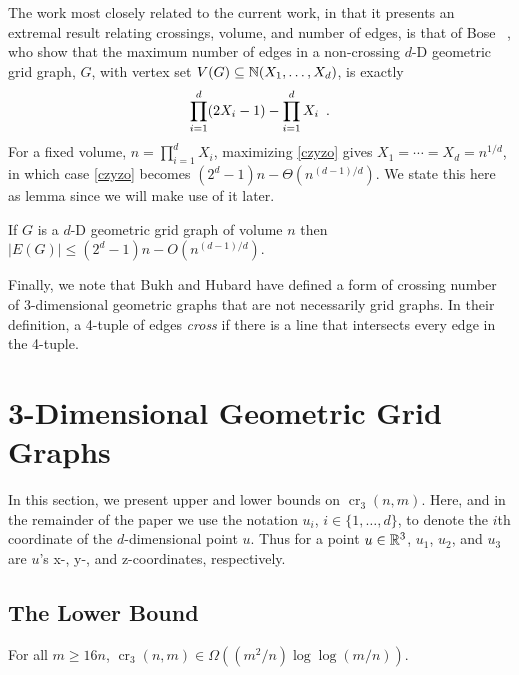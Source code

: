\documentclass{patmorin}
\DeclareMathOperator{\crs}{cr}
\begin{document}
The work most closely related to the current work, in that it presents
an extremal result relating crossings, volume, and number of edges, is
that of Bose \etal~\cite{bose.czyzowicz.ea:maximum}, who show that the
maximum number of edges in a non-crossing $d$-D geometric grid graph,
$G$, with vertex set $V(G)\subseteq \mathbb{N}(X_1,\ldots,X_d)$, is exactly
\begin{equation}
    \prod_{i=1}^d (2X_i-1) - \prod_{i=1}^d X_i \enspace . \eqlabel{czyzo}
\end{equation}
For a fixed volume, $n=\prod_{i=1}^d X_i$, maximizing \eqref{czyzo}
gives $X_1=\cdots=X_d=n^{1/d}$, in which case \eqref{czyzo} becomes
$(2^d-1)n - \Theta(n^{(d-1)/d})$.  We state this here as lemma since we
will make use of it later.
\begin{lem}
  If $G$ is a $d$-D geometric grid graph of volume $n$
  then $|E(G)|\le(2^d-1)n - O(n^{(d-1)/d})$.
\end{lem}

Finally, we note that Bukh and Hubard \cite{bhXX} have defined a form of
crossing number of 3-dimensional geometric graphs that are not necessarily
grid graphs.  In their definition, a 4-tuple of edges \emph{cross}
if there is a line that intersects every edge in the 4-tuple.

\section{3-Dimensional Geometric Grid Graphs}

In this section, we present upper and lower bounds on $\crs_3(n,m)$.
Here, and in the remainder of the paper we use the notation
$u_i$, $i\in\{1,\ldots,d\}$, to denote the $i$th coordinate of the
$d$-dimensional point $u$.  Thus for a point $u\in\mathbb{R}^3$, $u_1$, $u_2$,
and $u_3$ are $u$'s x-, y-, and z-coordinates, respectively.

\subsection{The Lower Bound}

\begin{thm}
  For all $m\ge 16n$, $\crs_3(n,m) \in \Omega((m^2/n)\log\log (m/n))$.
\end{thm}
\end{document}
